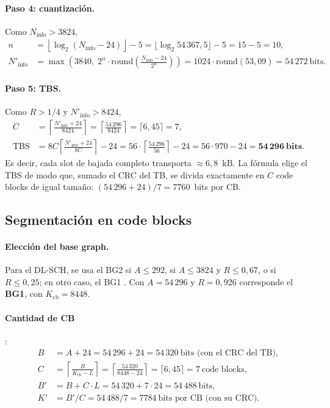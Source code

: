 \paragraph{Paso 4: cuantización.} Como $N_\text{info} > 3824$,
\begin{align}
n &= \left\lfloor \log_2(N_\text{info} - 24)\right\rfloor - 5 = \lfloor \log_2 54\,367{,}5\rfloor - 5 = 15 - 5 = 10,\\
N'_\text{info} &= \max\left(3840,\; 2^{n}\cdot\mathrm{round}\!\left(\frac{N_\text{info}-24}{2^n}\right)\right) = 1024\cdot\mathrm{round}(53{,}09) = 54\,272~\text{bits}.
\end{align}
\paragraph{Paso 5: TBS.} Como $R > 1/4$ y $N'_\text{info} > 8424$,
\begin{align}
C &= \left\lceil \frac{N'_\text{info}+24}{8424}\right\rceil = \left\lceil\frac{54\,296}{8424}\right\rceil = \lceil 6{,}45\rceil = 7,\\
\text{TBS} &= 8C\left\lceil\frac{N'_\text{info}+24}{8C}\right\rceil - 24 = 56\cdot\left\lceil\frac{54\,296}{56}\right\rceil - 24 = 56\cdot 970 - 24 = \mathbf{54\,296~bits}.
\label{eq:tbs}
\end{align}
Es decir, cada slot de bajada completo transporta $\approx 6{,}8$~kB. La fórmula elige el TBS de modo que, sumado el CRC del TB, se divida exactamente en $C$ code blocks de igual tamaño: $(54\,296+24)/7 = 7760$~bits por CB.

\subsection{Segmentación en code blocks}\label{sec:cb}
\paragraph{Elección del base graph.} Para el DL-SCH, se usa el BG2 si $A\le 292$, si $A\le 3824$ y $R\le 0{,}67$, o si $R\le 0{,}25$; en otro caso, el BG1 \cite[§7.2.2]{ts38212}. Con $A = 54\,296$ y $R=0{,}926$ corresponde el \textbf{BG1}, con $K_\text{cb} = 8448$.

\paragraph{Cantidad de CB} \cite[§5.2.2]{ts38212}:
\begin{align}
B &= A + 24 = 54\,296 + 24 = 54\,320~\text{bits (con el CRC del TB)},\\
C &= \left\lceil\frac{B}{K_\text{cb} - L}\right\rceil = \left\lceil\frac{54\,320}{8448-24}\right\rceil = \lceil 6{,}45\rceil = 7~\text{code blocks},\\
B' &= B + C\cdot L = 54\,320 + 7\cdot 24 = 54\,488~\text{bits},\\
K' &= B'/C = 54\,488/7 = 7784~\text{bits por CB (con su CRC)}.
\end{align}
